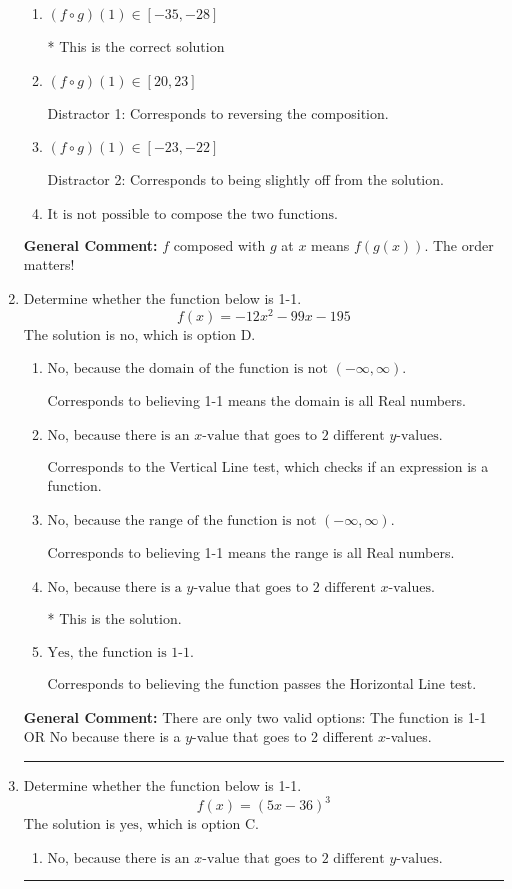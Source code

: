 \documentclass{extbook}[14pt]
\newcommand{\litem}[1]{\item #1

\rule{\textwidth}{0.4pt}}
\begin{document}
\begin{enumerate}
{\begin{enumerate}[label=\Alph*.]
 Distractor 3: Corresponds to being slightly off from the solution.
\item \( (f \circ g)(1) \in [-35, -28] \)

* This is the correct solution
\item \( (f \circ g)(1) \in [20, 23] \)

 Distractor 1: Corresponds to reversing the composition.
\item \( (f \circ g)(1) \in [-23, -22] \)

 Distractor 2: Corresponds to being slightly off from the solution.
\item \( \text{It is not possible to compose the two functions.} \)


\end{enumerate}

\textbf{General Comment:} $f$ composed with $g$ at $x$ means $f(g(x))$. The order matters!
}
\litem{
Determine whether the function below is 1-1.
\[ f(x) = -12 x^2 - 99 x - 195 \]The solution is \( \text{no} \), which is option D.\begin{enumerate}[label=\Alph*.]
\item \( \text{No, because the domain of the function is not $(-\infty, \infty)$.} \)

Corresponds to believing 1-1 means the domain is all Real numbers.
\item \( \text{No, because there is an $x$-value that goes to 2 different $y$-values.} \)

Corresponds to the Vertical Line test, which checks if an expression is a function.
\item \( \text{No, because the range of the function is not $(-\infty, \infty)$.} \)

Corresponds to believing 1-1 means the range is all Real numbers.
\item \( \text{No, because there is a $y$-value that goes to 2 different $x$-values.} \)

* This is the solution.
\item \( \text{Yes, the function is 1-1.} \)

Corresponds to believing the function passes the Horizontal Line test.
\end{enumerate}

\textbf{General Comment:} There are only two valid options: The function is 1-1 OR No because there is a $y$-value that goes to 2 different $x$-values.
}
\litem{
Determine whether the function below is 1-1.
\[ f(x) = (5 x - 36)^3 \]The solution is \( \text{yes} \), which is option C.\begin{enumerate}[label=\Alph*.]
\item \( \text{No, because there is an $x$-value that goes to 2 different $y$-values.} \)


\end{enumerate}}
\end{enumerate}
\end{document}
